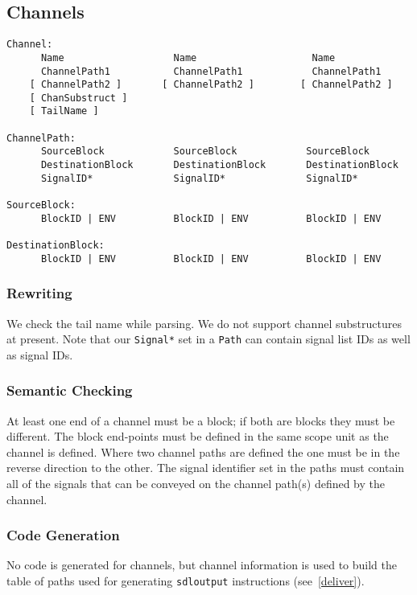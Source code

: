 \subsection{Channels}

\begin{verbatim}
Channel:
      Name                   Name                    Name
      ChannelPath1           ChannelPath1            ChannelPath1
    [ ChannelPath2 ]       [ ChannelPath2 ]        [ ChannelPath2 ]
    [ ChanSubstruct ]
    [ TailName ]

ChannelPath:
      SourceBlock            SourceBlock            SourceBlock
      DestinationBlock       DestinationBlock       DestinationBlock
      SignalID*              SignalID*              SignalID*

SourceBlock:
      BlockID | ENV          BlockID | ENV          BlockID | ENV

DestinationBlock:
      BlockID | ENV          BlockID | ENV          BlockID | ENV
\end{verbatim}

\subsubsection{Rewriting}

We check the tail name while parsing.
We do not support channel substructures at present.
Note that our {\tt Signal*} set in a
{\tt Path} can contain signal list IDs as well as signal IDs.

\subsubsection{Semantic Checking}

At least one end of a channel must be a block; if both are blocks
they must be different.
The block end-points must be defined in the same scope unit as the
channel is defined.
Where two channel paths are defined the one must be in the
reverse direction to the other.
The signal identifier set in the paths must contain all of the
signals that can be conveyed on the channel path(s) defined by the
channel.

\subsubsection{Code Generation}

No code is generated for channels, but channel information is used
to build the table of paths used for generating {\tt sdloutput}
instructions (see~\ref{deliver}).

